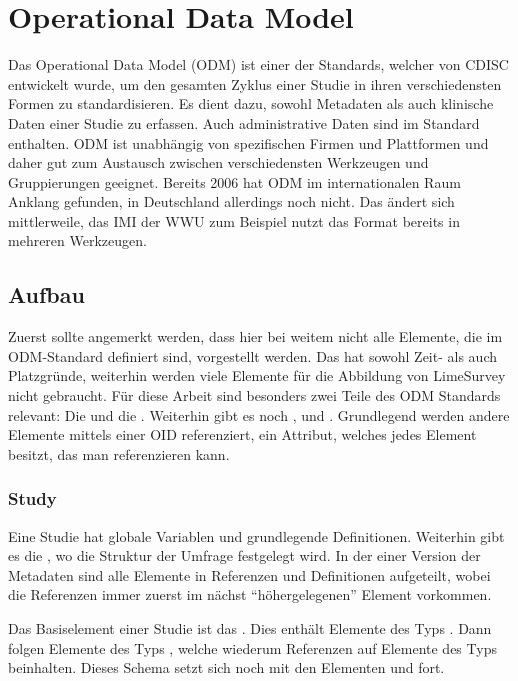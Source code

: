 \section{Operational Data Model}
\label{m:odm}

Das Operational Data Model (ODM) ist einer der Standards, welcher von CDISC entwickelt wurde, um den gesamten Zyklus einer Studie in ihren verschiedensten Formen zu standardisieren.
Es dient dazu, sowohl Metadaten als auch klinische Daten einer Studie zu erfassen. Auch administrative Daten sind im Standard enthalten.
ODM ist unabhängig von spezifischen Firmen und Plattformen und daher gut zum Austausch zwischen verschiedensten Werkzeugen und Gruppierungen geeignet.
Bereits 2006 hat ODM im internationalen Raum Anklang gefunden, in Deutschland allerdings noch nicht\cite{odm_art}.
Das ändert sich mittlerweile, das IMI der WWU zum Beispiel nutzt das Format bereits in mehreren Werkzeugen.

\subsection{Aufbau}

Zuerst sollte angemerkt werden, dass hier bei weitem nicht alle Elemente, die im ODM-Standard definiert sind, vorgestellt werden. Das hat sowohl Zeit- als auch Platzgründe, weiterhin werden viele Elemente für die Abbildung von LimeSurvey nicht gebraucht.
Für diese Arbeit sind besonders zwei Teile des ODM Standards relevant: Die  und die .
Weiterhin gibt es noch ,  und .
Grundlegend werden andere Elemente mittels einer OID referenziert, ein Attribut, welches jedes Element besitzt, das man referenzieren kann.

\subsubsection{Study}

Eine Studie hat globale Variablen und grundlegende Definitionen.
Weiterhin gibt es die , wo die Struktur der Umfrage festgelegt wird.
In der einer Version der Metadaten sind alle Elemente in Referenzen und Definitionen aufgeteilt, wobei die Referenzen immer zuerst im nächst \enquote{höhergelegenen} Element vorkommen.

Das Basiselement einer Studie ist das .
Dies enthält Elemente des Typs .
Dann folgen Elemente des Typs , welche wiederum Referenzen auf Elemente des Typs  beinhalten.
Dieses Schema setzt sich noch mit den Elementen  und  fort.

